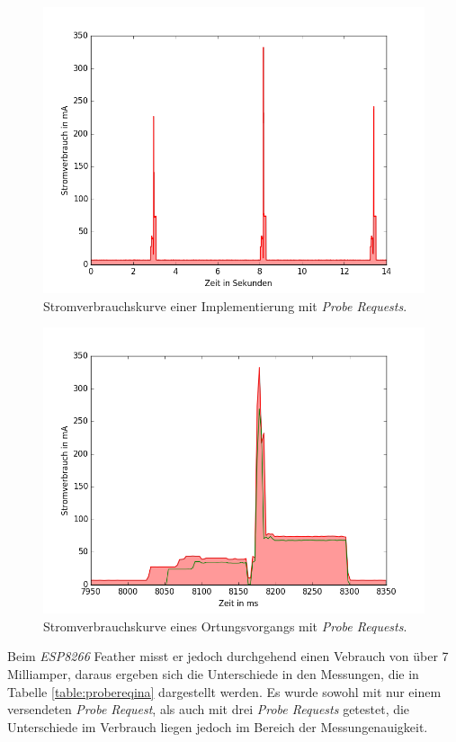 \begin{figure}[h!]
  \centering
	\includegraphics[width=\textwidth]{plots/probereqfull.png}
  \caption{Stromverbrauchskurve einer Implementierung mit \emph{Probe Requests}.}
  \label{fig:probereqfull}
\end{figure}

\begin{figure}[h!]
  \centering
	\includegraphics[width=\textwidth]{plots/probereqv.png}
  \caption{Stromverbrauchskurve eines Ortungsvorgangs mit \emph{Probe Requests}.}
  \label{fig:probereqv}
\end{figure}

Beim \emph{ESP8266} Feather misst er jedoch durchgehend einen Vebrauch von über 7 Milliamper, daraus ergeben sich die Unterschiede in den Messungen, die in Tabelle \ref{table:probereqina} dargestellt werden.
Es wurde sowohl mit nur einem versendeten \emph{Probe Request}, als auch mit drei \emph{Probe Requests} getestet, die Unterschiede im Verbrauch liegen jedoch im Bereich der Messungenauigkeit.

